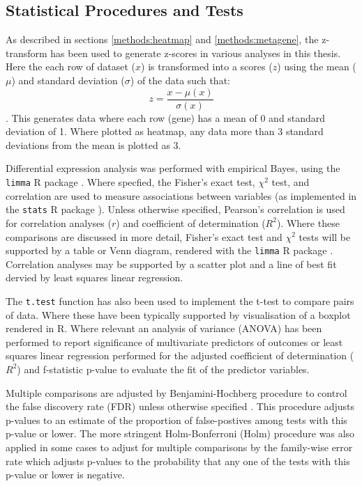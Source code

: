 \subsection{Statistical Procedures and Tests}

As described in sections \ref{methods:heatmap} and \ref{methods:metagene}, the z-transform has been used to generate z-scores in various analyses in this thesis. Here the each row of dataset ($x$) is transformed into a scores ($z$) using the mean ($\mu$) and standard deviation ($\sigma$) of the data such that: $$ z = \frac{x - \mu(x)}{\sigma(x)} $$. This generates data where each row (gene) has a mean of 0 and standard deviation of 1. Where plotted as heatmap, any data more than 3 standard deviations from the mean is plotted as 3.

Differential expression analysis was performed with empirical Bayes, using the \texttt{limma} R package \citep{limma}. Where specfied, the Fisher's exact test, $\chi^2$ test, and correlation are used to measure associations between variables (as implemented in the \texttt{stats} R package \citep{R_core}). Unless otherwise specified, Pearson's correlation is used for correlation analyses ($r$) and coefficient of determination ($R^2$). Where these comparisons are discussed in more detail, Fisher's exact test and $\chi^2$ tests will be supported by a table or Venn diagram, rendered with the \texttt{limma} R package \citep{limma}. Correlation analyses may be supported by a scatter plot and a line of best fit dervied by least squares linear regression. 

The \texttt{t.test} function \citep{R_core} has also been used to implement the t-test to compare pairs of data. Where these have been typically supported by visualisation of a boxplot rendered in R. Where relevant an analysis of variance (ANOVA) has been performed to report significance of multivariate predictors of outcomes or least squares linear regression performed for the adjusted coefficient of determination ($R^2$) and f-statistic p-value to evaluate the fit of the predictor variables.

Multiple comparisons are adjusted by Benjamini-Hochberg procedure to control the false discovery rate (FDR) unless otherwise specified \citep{fdr1995}. This procedure adjusts p-values to an estimate of the proportion of false-postives among tests with this p-value or lower. The more stringent Holm-Bonferroni (Holm) procedure \citep{Holm1979} was also applied in some cases to adjust for multiple comparisons by the family-wise error rate which adjusts p-values to the probability that any one of the tests with this p-value or lower is negative.


